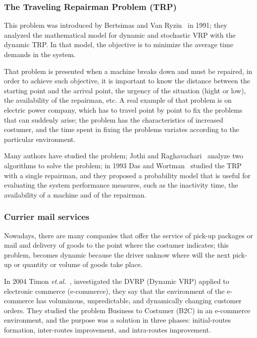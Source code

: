 \subsubsection*{The Traveling Repairman Problem (TRP)} 

This problem was introduced by Bertsimas and Van Ryzin~\cite{bertsimas_stochastic_1991} in 1991; they analyzed the mathematical model for dynamic and stochastic VRP with the dynamic TRP. In that model, the objective is to minimize the average time demands in the system. 

That problem is presented when a machine breaks down and must be repaired, in order to achieve such objective, it is important  to know the distance between the starting point and the arrival point, the urgency of the situation (hight or low), the availability of the repairman, etc. A real example of that problem is on electric power company, which has to travel point by point  to fix the problems that can suddenly arise; the problem has the characteristics of increased costumer, and the time spent in fixing the problems variates according to the particular environment.

Many authors have studied the problem; Jothi and Raghavachari~\cite{jothi_approximatingk-traveling_2007} analyze two algorithms to solve the problem; in 1993 Das and Wortman~\cite{Tapas} studied the TRP with a single repairman, and they  proposed a probability model that is useful for evaluating the system performance measures, such as the inactivity time, the availability of a machine and of the repairman.  

\subsubsection*{Currier mail services} 

Nowadays, there are many companies that offer the service of pick-up packages or mail and delivery of goods to the point where the costumer indicates; this problem, becomes dynamic because the driver unknow where will the next pick-up or quantity or volume of goods take place.

In 2004 Timon \textit{et.al.}~\cite{Timon}, investigated the DVRP (Dynamic VRP) applied to electronic commerce (e-commerce), they say that the  environment of the e-commerce has voluminous, unpredictable, and dynamically changing customer orders. They studied the problem Business to Costumer (B2C) in an e-commerce environment, and the purpose was a solution in three phases: initial-routes formation, inter-routes improvement, and intra-routes improvement.

